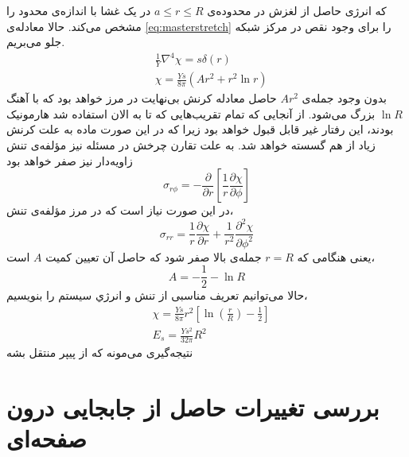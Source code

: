 که انرژی حاصل از لغزش در محدوده‌ی 
$a\leq r\leq R$
در یک غشا با اندازه‌ی محدود را مشخص می‌کند. حالا معادله‌ی 
\ref{eq:masterstretch}
را برای وجود نقص در  مرکز  شبکه جلو می‌بریم.
\begin{equation}
\begin{aligned}
&\frac{1}{Y}\nabla^4\chi=s\delta(r)\\
&\chi=\frac{Ys}{8\pi}(Ar^2+r^2\ln r)
\end{aligned}
\end{equation}
بدون وجود جمله‌ی $Ar^2$
حاصل معادله کرنش بی‌نهایت در مرز خواهد بود که با آهنگ $\ln R$ بزرگ می‌شود. از آنجایی که تمام تقریب‌هایی که تا به الان استفاده شد هارمونیک بودند، این رفتار غیر قابل قبول خواهد بود زیرا که در این صورت ماده به علت کرنش زیاد از هم گسسته خواهد شد. به علت تقارن چرخش در مسئله نیز مؤلفه‌ی تنش زاویه‌دار نیز صفر  خواهد بود
\begin{equation}
\sigma_{r\phi}=-\frac{\partial}{\partial r}\left[\frac{1}{r}\frac{\partial\chi}{\partial\phi}\right]
\end{equation}
در این صورت نیاز است که در مرز مؤلفه‌ی تنش،
\begin{equation}
\sigma_{rr}=\frac{1}{r}\frac{\partial\chi}{\partial r}+\frac{1}{r^2}\frac{\partial^2\chi}{\partial \phi^2}
\end{equation}
یعنی هنگامی که $r=R$ جمله‌ی بالا صفر شود که حاصل آن تعیین کمیت $A$
است،
\begin{equation}
A=-\frac{1}{2}-\ln R
\end{equation}
حالا می‌توانیم تعریف مناسبی از تنش و انرژي سیستم را بنویسیم،
\begin{equation}
\begin{aligned}
&\chi=\frac{Ys}{8\pi}r^2\left[\ln \left(\frac{r}{R}\right)-\frac{1}{2}\right]\\
&E_s=\frac{Ys^2}{32\pi}R^2
\end{aligned}
\end{equation}
نتیجه‌گیری می‌مونه که از پیپر منتقل بشه


















\section{بررسی تغییرات حاصل از جابجایی درون صفحه‌ای}

